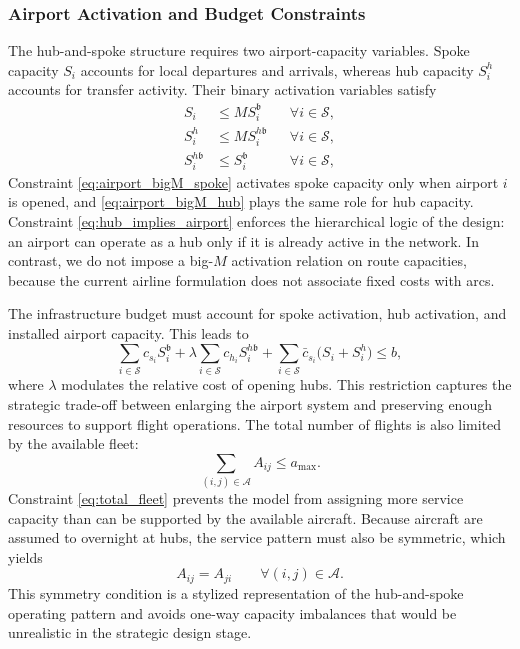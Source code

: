 \subsubsection{Airport Activation and Budget Constraints}
The hub-and-spoke structure requires two airport-capacity variables. Spoke capacity $S_i$ accounts for local departures and arrivals, whereas hub capacity $S_i^h$ accounts for transfer activity. Their binary activation variables satisfy
\begin{align}
S_i &\le M S_i^{\mathfrak b}
&& \forall i\in\mathcal{S}, \label{eq:airport_bigM_spoke}\\
S_i^h &\le M S_i^{h\mathfrak b}
&& \forall i\in\mathcal{S}, \label{eq:airport_bigM_hub}\\
S_i^{h\mathfrak b} &\le S_i^{\mathfrak b}
&& \forall i\in\mathcal{S}, \label{eq:hub_implies_airport}
\end{align}
Constraint \eqref{eq:airport_bigM_spoke} activates spoke capacity only when airport $i$ is opened, and \eqref{eq:airport_bigM_hub} plays the same role for hub capacity. Constraint \eqref{eq:hub_implies_airport} enforces the hierarchical logic of the design: an airport can operate as a hub only if it is already active in the network. In contrast, we do not impose a big-$M$ activation relation on route capacities, because the current airline formulation does not associate fixed costs with arcs.

The infrastructure budget must account for spoke activation, hub activation, and installed airport capacity. This leads to
\begin{equation}
\sum_{i\in\mathcal{S}} c_{s_i}S_i^{\mathfrak b}
+ \lambda \sum_{i\in\mathcal{S}} c_{h_i}S_i^{h\mathfrak b}
+ \sum_{i\in\mathcal{S}} \bar c_{s_i}\bigl(S_i+S_i^h\bigr)
\le b,
\label{eq:hub_budget}
\end{equation}
where $\lambda$ modulates the relative cost of opening hubs. This restriction captures the strategic trade-off between enlarging the airport system and preserving enough resources to support flight operations. The total number of flights is also limited by the available fleet:
\begin{equation}
\sum_{(i,j)\in\mathcal{A}} A_{ij} \le a_{\max}.
\label{eq:total_fleet}
\end{equation}
Constraint \eqref{eq:total_fleet} prevents the model from assigning more service capacity than can be supported by the available aircraft. Because aircraft are assumed to overnight at hubs, the service pattern must also be symmetric, which yields
\begin{equation}
A_{ij}=A_{ji}
\qquad \forall (i,j)\in\mathcal{A}.
\label{eq:symmetric_capacity}
\end{equation}
This symmetry condition is a stylized representation of the hub-and-spoke operating pattern and avoids one-way capacity imbalances that would be unrealistic in the strategic design stage.

